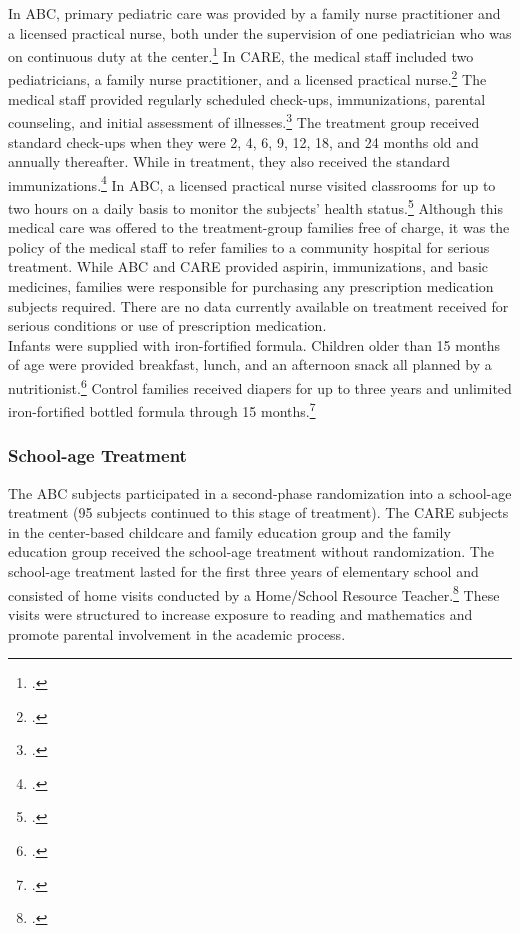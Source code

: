 \begin{appendices}
\noindent In ABC, primary pediatric care was provided by a family nurse practitioner and a licensed practical nurse, both under the supervision of one pediatrician who was on continuous duty at the center.\footnote{\citet{Haskins-et-al_1978_JoPP}.} In CARE, the medical staff included two pediatricians, a family nurse practitioner, and a licensed practical nurse.\footnote{\citet{Bryant_et_al_1987_Carolina_Approach_TIECSE}.} The medical staff provided regularly scheduled check-ups, immunizations, parental counseling, and initial assessment of illnesses.\footnote{\citet{Ramey-et-al_1977_Intro-to-ABC, Bryant_et_al_1987_Carolina_Approach_TIECSE}.} The treatment group received standard check-ups when they were 2, 4, 6, 9, 12, 18, and 24 months old and annually thereafter. While in treatment, they also received the standard immunizations.\footnote{\citet{Bryant_et_al_1987_Carolina_Approach_TIECSE, Campbell_Conti_etal_2014_EarlyChildhoodInvestments}.} In ABC, a licensed practical nurse visited classrooms for up to two hours on a daily basis to monitor the subjects' health status.\footnote{\citet{Sanyal_Henderson_etal_1980_JoPediatrics}.} Although this medical care was offered to the treatment-group families free of charge, it was the policy of the medical staff to refer families to a community hospital for serious treatment. While ABC and CARE provided aspirin, immunizations, and basic medicines, families were responsible for purchasing any prescription medication subjects required. There are no data currently available on treatment received for serious conditions or use of prescription medication.  \\

\noindent Infants were supplied with iron-fortified formula. Children older than 15 months of age were provided breakfast, lunch, and an
afternoon snack all planned by a nutritionist.\footnote{\citet{Bryant_et_al_1987_Carolina_Approach_TIECSE, Campbell_Conti_etal_2014_EarlyChildhoodInvestments,abc2014-2015interviews}.} Control families received diapers for up to three years and unlimited iron-fortified bottled formula through 15 months.\footnote{\citet{Ramey_Collier_etal_1976_CarolinaAbecedarianProject,Ramey_Campbell_1979_SR, Ramey_etal_1985_Project-CARE_TiECSE}.}

\subsubsection{School-age Treatment}

\noindent The ABC subjects participated in a second-phase randomization into a school-age treatment (95 subjects continued to this stage of treatment). The CARE subjects in the center-based childcare and family education group and the family education group received the school-age treatment without randomization. The school-age treatment lasted for the first three years of elementary school and consisted of home visits conducted by a Home/School Resource Teacher.\footnote{\cite{Burchinal_Campbell_etal_1997_CD}.} These visits were structured to increase exposure to reading and mathematics and promote parental involvement in the academic process.\\


\end{appendices}
